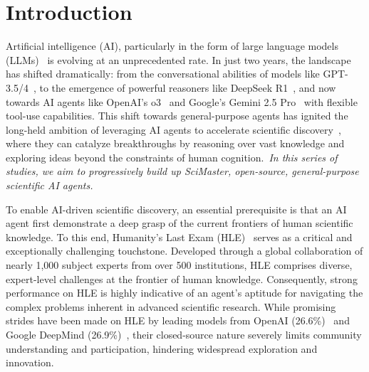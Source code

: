\documentclass{article}
\begin{document}
    


\section{Introduction}

Artificial intelligence (AI), particularly in the form of large language models (LLMs)~\citep{chatgpt,dubey2024llama,qwen2.5} is evolving at an unprecedented rate.
In just two years, the landscape has shifted dramatically: from the conversational abilities of models like GPT-3.5/4~\citep{ouyang2022training,openai2023gpt4}, to the emergence of powerful reasoners like DeepSeek R1~\citep{guo2025deepseek}, and now towards AI agents like OpenAI's o3~\citep{o3} and Google's Gemini 2.5 Pro~\citep{gemini-2.5-pro} with flexible tool-use capabilities.
This shift towards general-purpose agents has ignited the long-held ambition of leveraging AI agents to accelerate scientific discovery~\citep{gottweis2025towards}, where they can catalyze breakthroughs by reasoning over vast knowledge and exploring ideas beyond the constraints of human cognition.~\emph{In this series of studies, we aim to progressively build up \emph{SciMaster}, open-source, general-purpose scientific AI agents.}


To enable AI-driven scientific discovery, an essential prerequisite is that an AI agent first demonstrate a deep grasp of the current frontiers of human scientific knowledge.
To this end, Humanity’s Last Exam (HLE)~\citep{hle} serves as a critical and exceptionally challenging touchstone.
Developed through a global collaboration of nearly 1,000 subject experts from over 500 institutions, HLE comprises diverse, expert-level challenges at the frontier of human knowledge.
Consequently, strong performance on HLE is highly indicative of an agent's aptitude for navigating the complex problems inherent in advanced scientific research.
While promising strides have been made on HLE by leading models from OpenAI (26.6\%)~\citep{openai_deep_research} and Google DeepMind (26.9\%)~\citep{gemini-2.5-pro}, their closed-source nature severely limits community understanding and participation, hindering widespread exploration and innovation. 
\end{document}
